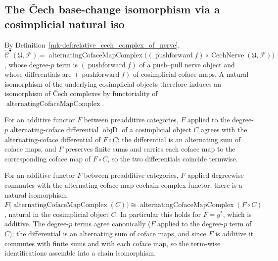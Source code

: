 \subsection{The {\v C}ech base-change isomorphism via a cosimplicial natural iso}
\label{mk-sec:cech_base_change_construction}

By Definition~\ref{mk-def:relative_cech_complex_of_nerve},
\(\check{\mathcal{C}}^\bullet(\mathfrak{U}, \mathcal{F}) =
\operatorname{alternatingCofaceMapComplex}\bigl((\operatorname{pushforward} f) \circ
\operatorname{CechNerve}(\mathfrak{U}, \mathcal{F})\bigr)\), whose degree-\(p\) term is
\((\operatorname{pushforward} f)\) of a push--pull nerve object and whose differentials
are \((\operatorname{pushforward} f)\) of cosimplicial coface maps. A natural
isomorphism of the underlying cosimplicial objects therefore induces an isomorphism
of {\v C}ech complexes by functoriality of
\(\operatorname{alternatingCofaceMapComplex}\).

\begin{lemma}\label{mk-lem:map_alternatingCofaceMapComplex_objD}
  \leanok

  For an additive functor \(F\) between preadditive categories, \(F\) applied to the
  degree-\(p\) alternating-coface differential \(\operatorname{objD}\) of a cosimplicial
  object \(C\) agrees with the alternating-coface differential of \(F \circ C\): the
  differential is an alternating sum of coface maps, and \(F\) preserves finite sums and
  carries each coface map to the corresponding coface map of \(F \circ C\), so the two
  differentials coincide termwise.
\end{lemma}

\begin{lemma}\label{mk-lem:pullback_commutes_alternatingCofaceMapComplex}
  \leanok

  For an additive functor \(F\) between preadditive categories, \(F\) applied
  degreewise commutes with the alternating-coface-map cochain complex functor: there is
  a natural isomorphism
  \(F\bigl(\operatorname{alternatingCofaceMapComplex}(C)\bigr) \cong
  \operatorname{alternatingCofaceMapComplex}(F \circ C)\), natural in the cosimplicial
  object \(C\). In particular this holds for \(F = g^*\), which is additive.
  The degree-\(p\) terms agree canonically (\(F\) applied to the
  degree-\(p\) term of \(C\)); the differential is an alternating sum of coface maps,
  and since \(F\) is additive it commutes with finite sums and with each coface map, so
  the term-wise identifications assemble into a chain isomorphism.
\end{lemma}

